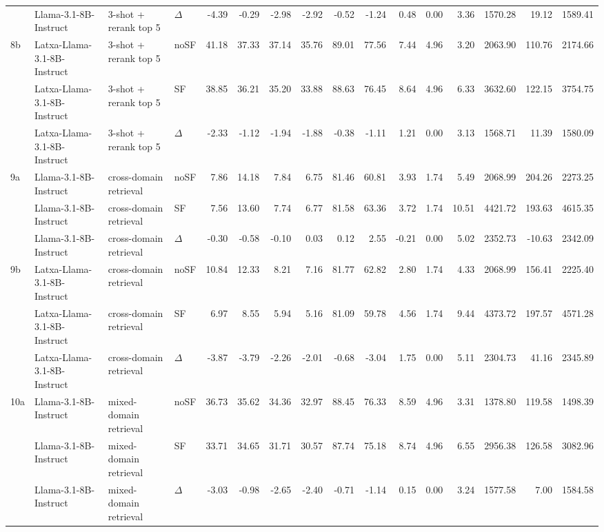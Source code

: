 \begin{landscape}
\begin{footnotesize}
\begin{longtable}{l l l l r r r r r r r r r r r r}
 & Llama-3.1-8B-Instruct & 3-shot + rerank top 5 & $\Delta$ & -4.39 & -0.29 & -2.98 & -2.92 & -0.52 & -1.24 & 0.48 & 0.00 & 3.36 & 1570.28 & 19.12 & 1589.41 \\
\rowcolor{tabhighlight}\textrightarrow{} 8b & Latxa-Llama-3.1-8B-Instruct & 3-shot + rerank top 5 & noSF & 41.18 & 37.33 & 37.14 & 35.76 & 89.01 & 77.56 & 7.44 & 4.96 & 3.20 & 2063.90 & 110.76 & 2174.66 \\
 & Latxa-Llama-3.1-8B-Instruct & 3-shot + rerank top 5 & SF & 38.85 & 36.21 & 35.20 & 33.88 & 88.63 & 76.45 & 8.64 & 4.96 & 6.33 & 3632.60 & 122.15 & 3754.75 \\
 & Latxa-Llama-3.1-8B-Instruct & 3-shot + rerank top 5 & $\Delta$ & -2.33 & -1.12 & -1.94 & -1.88 & -0.38 & -1.11 & 1.21 & 0.00 & 3.13 & 1568.71 & 11.39 & 1580.09 \\
\midrule
9a & Llama-3.1-8B-Instruct & cross-domain retrieval & noSF & 7.86 & 14.18 & 7.84 & 6.75 & 81.46 & 60.81 & 3.93 & 1.74 & 5.49 & 2068.99 & 204.26 & 2273.25 \\
 & Llama-3.1-8B-Instruct & cross-domain retrieval & SF & 7.56 & 13.60 & 7.74 & 6.77 & 81.58 & 63.36 & 3.72 & 1.74 & 10.51 & 4421.72 & 193.63 & 4615.35 \\
 & Llama-3.1-8B-Instruct & cross-domain retrieval & $\Delta$ & -0.30 & -0.58 & -0.10 & 0.03 & 0.12 & 2.55 & -0.21 & 0.00 & 5.02 & 2352.73 & -10.63 & 2342.09 \\
9b & Latxa-Llama-3.1-8B-Instruct & cross-domain retrieval & noSF & 10.84 & 12.33 & 8.21 & 7.16 & 81.77 & 62.82 & 2.80 & 1.74 & 4.33 & 2068.99 & 156.41 & 2225.40 \\
 & Latxa-Llama-3.1-8B-Instruct & cross-domain retrieval & SF & 6.97 & 8.55 & 5.94 & 5.16 & 81.09 & 59.78 & 4.56 & 1.74 & 9.44 & 4373.72 & 197.57 & 4571.28 \\
 & Latxa-Llama-3.1-8B-Instruct & cross-domain retrieval & $\Delta$ & -3.87 & -3.79 & -2.26 & -2.01 & -0.68 & -3.04 & 1.75 & 0.00 & 5.11 & 2304.73 & 41.16 & 2345.89 \\
\midrule
10a & Llama-3.1-8B-Instruct & mixed-domain retrieval & noSF & 36.73 & 35.62 & 34.36 & 32.97 & 88.45 & 76.33 & 8.59 & 4.96 & 3.31 & 1378.80 & 119.58 & 1498.39 \\
 & Llama-3.1-8B-Instruct & mixed-domain retrieval & SF & 33.71 & 34.65 & 31.71 & 30.57 & 87.74 & 75.18 & 8.74 & 4.96 & 6.55 & 2956.38 & 126.58 & 3082.96 \\
 & Llama-3.1-8B-Instruct & mixed-domain retrieval & $\Delta$ & -3.03 & -0.98 & -2.65 & -2.40 & -0.71 & -1.14 & 0.15 & 0.00 & 3.24 & 1577.58 & 7.00 & 1584.58 \\

\end{longtable}
\end{footnotesize}
\end{landscape}
